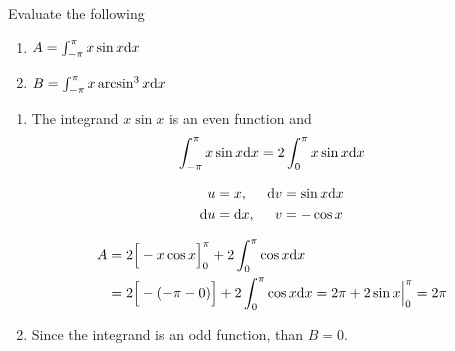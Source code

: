 \documentclass[11pt]{amsbook}
\begin{document}
    
    \begin{exmp} 
        Evaluate the following
        \begin{enumerate}[label=(\alph*)]
            \item $A = \int_{-\pi}^{\pi} x \sin x \mathrm{d} x$
            \item $B = \int_{-\pi}^{\pi} x \arcsin^3 x \mathrm{d} x$
        \end{enumerate}
    \end{exmp}
    
    \begin{hSolution}
        \begin{enumerate}[label=(\alph*)]
            \item The integrand $x \sin x$ is an even function and
                $$ \int_{-\pi}^{\pi} 
                x \sin x \mathrm{d} x 
                = 2 \int_{0}^{\pi} 
                x \sin x \mathrm{d} x$$
                
                \begin{align*}
                    u &= x,                &   \mathrm{d} v &= \sin x \mathrm{d} x\\
                    \mathrm{d} u &= \mathrm{d} x,    &   v &= -\cos x
                \end{align*}
                
                \begin{align*}
                    A &= 2 
                    \Big[-x \cos x \Big]_{0}^{\pi}
                    + 2 \int_{0}^{\pi} 
                    \cos x \mathrm{d} x\\
                    &= 2 
                    \Big[ -(-\pi - 0) \Big] 
                    + 2 \int_{0}^{\pi} 
                    \cos x \mathrm{d} x 
                    = 2 \pi + 2 \sin x \Big|_{0}^{\pi} 
                    = 2 \pi
                \end{align*}
            
            \item Since the integrand is an odd function, than $B = 0$.
            
        \end{enumerate}

    \end{hSolution}
\end{document}
